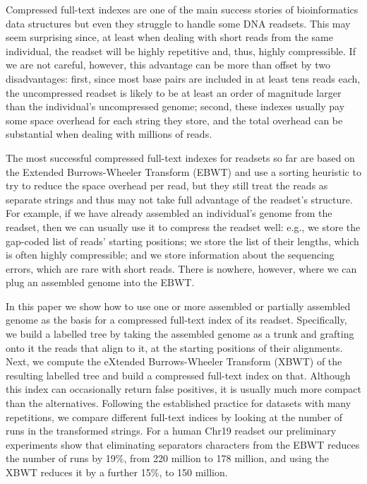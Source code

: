 
\newcommand{\inputXBWT}[1]{}
\newcommand{\figXBWT}[2]{\texttt{[image: Part\_Two/xbwt/\#2]}}

\begin{small}

Compressed full-text indexes are one of the main success stories of bioinformatics data structures but even they struggle to handle some DNA readsets.  This may seem surprising since, at least when dealing with short reads from the same individual, the readset will be highly repetitive and, thus, highly compressible.  If we are not careful, however, this advantage can be more than offset by two disadvantages: first, since most base pairs are included in at least tens reads each, the uncompressed readset is likely to be at least an order of magnitude larger than the individual's uncompressed genome; second, these indexes usually pay some space overhead for each string they store, and the total overhead can be substantial when dealing with millions of reads.


The most successful compressed full-text indexes for readsets so far are based on the Extended Burrows-Wheeler Transform (EBWT) and use a sorting heuristic to try to reduce the space overhead per read, but they still treat the reads as separate strings and thus may not take full advantage of the readset's structure.  For example, if we have already assembled an individual's genome from the readset, then we can usually use it to compress the readset well: e.g., we store the gap-coded list of reads' starting positions; we store the list of their lengths, which is often highly compressible; and we store information about the sequencing errors, which are rare with short reads.  There is nowhere, however, where we can plug an assembled genome into the EBWT.

In this paper we show how to use one or more assembled or partially assembled genome as the basis for a compressed full-text index of its readset.  Specifically, we build a labelled tree by taking the assembled genome as a trunk and grafting onto it the reads that align to it, at the starting positions of their alignments.  Next, we compute the eXtended Burrows-Wheeler Transform (XBWT) of the resulting labelled tree and build a compressed full-text index on that. Although this index can occasionally return false positives, it is usually much more compact than the alternatives.
Following the established practice for datasets with many repetitions, we compare different full-text indices by looking at the number of runs in the transformed strings. For a human Chr19 readset our preliminary experiments show that eliminating separators characters from the EBWT reduces the number of runs by 19\%, from 220 million to 178 million, and using the XBWT reduces it by a further 15\%, to 150 million.

\end{small}

